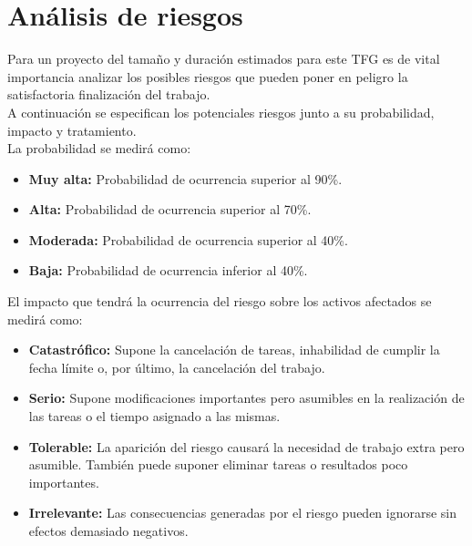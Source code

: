 

\section{Análisis de riesgos}

Para un proyecto del tamaño y duración estimados para este TFG es de vital importancia analizar los posibles riesgos que pueden poner en peligro la satisfactoria finalización del trabajo.\\

A continuación se especifican los potenciales riesgos junto a su probabilidad, impacto y tratamiento.\\

La probabilidad se medirá como:

\begin{itemize}
    \item \textbf{Muy alta:} Probabilidad de ocurrencia superior al 90\%.
    \item \textbf{Alta:} Probabilidad de ocurrencia superior al 70\%.
    \item \textbf{Moderada:} Probabilidad de ocurrencia superior al 40\%.
    \item \textbf{Baja:} Probabilidad de ocurrencia inferior al 40\%.
\end{itemize}

El impacto que tendrá la ocurrencia del riesgo sobre los activos afectados se medirá como:

\begin{itemize}
    \item \textbf{Catastrófico: } Supone la cancelación de tareas, inhabilidad de cumplir la fecha límite o, por último, la cancelación del trabajo.
    \item \textbf{Serio: } Supone modificaciones importantes pero asumibles en la realización de las tareas o el tiempo asignado a las mismas.
    \item \textbf{Tolerable: } La aparición del riesgo causará la necesidad de trabajo extra pero asumible. También puede suponer eliminar tareas o resultados poco importantes.
    \item \textbf{Irrelevante: } Las consecuencias generadas por el riesgo pueden ignorarse sin efectos demasiado negativos.
\end{itemize}

